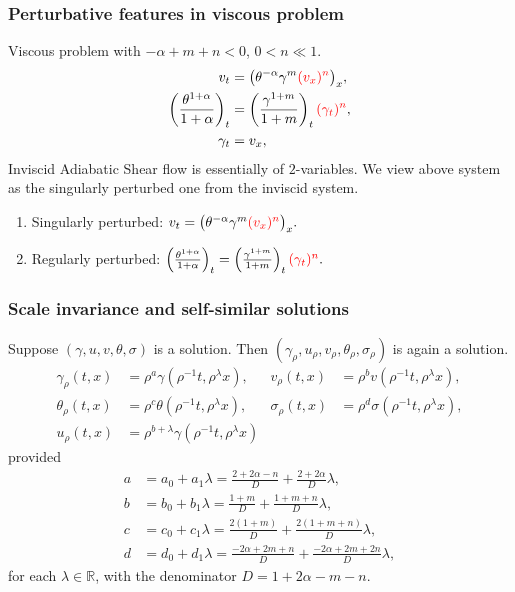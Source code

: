 \documentclass{beamer}
\def\red{\color{red}}
\begin{document}
\begin{frame}
 \frametitle{Perturbative features in viscous problem}
 Viscous problem with {\scriptsize {\red $-\alpha +m+n<0$}, $0<n\ll1$.}
 \begin{align*}
  v_t &= \big(\theta^{-\alpha}\gamma^m {\red (v_x)^n}\big)_x,\\
  \left(\frac{\theta^{1+\alpha}}{1+\alpha}\right)_t &= \left(\frac{\gamma^{1+m}}{1+m}\right)_t{\red (\gamma_t)^n},\\
  \gamma_t&=v_x,
 \end{align*}
 Inviscid Adiabatic Shear flow is essentially of $2$-variables. We view above system as the singularly perturbed one from the inviscid system.
  \vfill
 \begin{enumerate}
  \item Singularly perturbed:
  $v_t = \big(\theta^{-\alpha}\gamma^m {\red (v_x)^n}\big)_x.$
  \item Regularly perturbed:
  $ \left(\frac{\theta^{1+\alpha}}{1+\alpha}\right)_t = \left(\frac{\gamma^{1+m}}{1+m}\right)_t{\red (\gamma_t)^n}.$
 \end{enumerate}
\end{frame}

\begin{frame}
 \frametitle{Scale invariance and self-similar solutions}
 Suppose $(\gamma,u,v,\theta,\sigma)$ is a solution. Then $(\gamma_\rho,u_\rho,v_\rho,\theta_\rho,\sigma_\rho)$ is again a solution.
\begin{equation}\label{eq:scale}
\begin{aligned}
 \gamma_\rho(t,x) &= \rho^a\gamma(\rho^{-1}t,\rho^\lambda x), &
 v_\rho(t,x) &= \rho^bv(\rho^{-1}t,\rho^\lambda x),\\
 \theta_\rho(t,x) &= \rho^c\theta(\rho^{-1}t,\rho^\lambda x), &
 \sigma_\rho(t,x) &= \rho^d\sigma(\rho^{-1}t,\rho^\lambda x),\\
 u_\rho(t,x) &= \rho^{b+\lambda}\gamma(\rho^{-1}t,\rho^\lambda x)
\end{aligned}
\end{equation}
provided{\scriptsize
\begin{equation} \label{eq:exponents}
\begin{aligned}
 a&= a_0 + a_1 \lambda=\frac{2+2\alpha-n}{D} + \frac{2+2\alpha}{D}\lambda, \\ b&=b_0 + b_1\lambda=\frac{1+m}{D} + \frac{1+m+n}{D}\lambda ,\\
 c&=c_0 + c_1\lambda=\frac{2(1+m)}{D} + \frac{2(1+m+n)}{D}\lambda, \\ d&=d_0 + d_1\lambda=\frac{-2\alpha + 2m +n}{D} + \frac{-2\alpha+2m+2n}{D}\lambda,
\end{aligned}
\end{equation}}
for each $\lambda \in \mathbb{R}$, with the denominator $D = 1+2\alpha-m-n$.
\end{frame}
\end{document}

